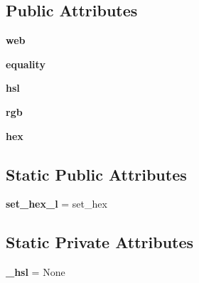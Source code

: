 \subsection*{Public Attributes}
\begin{DoxyCompactItemize}
\item 
\hypertarget{classcolour_1_1Color_a2345c712c9865e6c6a1dbc58bef3d223}{}{\bfseries web}\label{classcolour_1_1Color_a2345c712c9865e6c6a1dbc58bef3d223}

\item 
\hypertarget{classcolour_1_1Color_a5c45a3d98d5c07caf3c5c62000f333c2}{}{\bfseries equality}\label{classcolour_1_1Color_a5c45a3d98d5c07caf3c5c62000f333c2}

\item 
\hypertarget{classcolour_1_1Color_a6beed3d9dcd875668583747c8e3391c6}{}{\bfseries hsl}\label{classcolour_1_1Color_a6beed3d9dcd875668583747c8e3391c6}

\item 
\hypertarget{classcolour_1_1Color_a673b09c77450396516798614b6c8d319}{}{\bfseries rgb}\label{classcolour_1_1Color_a673b09c77450396516798614b6c8d319}

\item 
\hypertarget{classcolour_1_1Color_a15a66e3ea70ace2c23e560f5bb22e49e}{}{\bfseries hex}\label{classcolour_1_1Color_a15a66e3ea70ace2c23e560f5bb22e49e}

\end{DoxyCompactItemize}
\subsection*{Static Public Attributes}
\begin{DoxyCompactItemize}
\item 
\hypertarget{classcolour_1_1Color_a3e7d503337f6c4c7b0395220b02f8bc7}{}{\bfseries set\+\_\+hex\+\_\+l} = set\+\_\+hex\label{classcolour_1_1Color_a3e7d503337f6c4c7b0395220b02f8bc7}

\end{DoxyCompactItemize}
\subsection*{Static Private Attributes}
\begin{DoxyCompactItemize}
\item 
\hypertarget{classcolour_1_1Color_abfa3f6a36a1e85f30908b3733d9e0957}{}{\bfseries \+\_\+hsl} = None\label{classcolour_1_1Color_abfa3f6a36a1e85f30908b3733d9e0957}

\end{DoxyCompactItemize}



